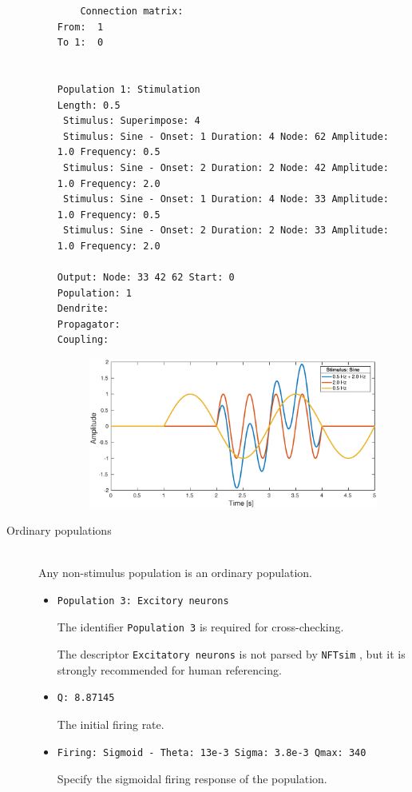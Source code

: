 \documentclass[12pt,a4paper]{article}
\newcommand{\type}[1]{{\small\small\tt #1} }
\newcommand{\NF}[0]{\type{NFTsim}}
\begin{document}
\begin{description}
\begin{itemize}
\begin{lstlisting}
    Connection matrix:
From:  1 
To 1:  0


Population 1: Stimulation
Length: 0.5
 Stimulus: Superimpose: 4
 Stimulus: Sine - Onset: 1 Duration: 4 Node: 62 Amplitude: 1.0 Frequency: 0.5
 Stimulus: Sine - Onset: 2 Duration: 2 Node: 42 Amplitude: 1.0 Frequency: 2.0
 Stimulus: Sine - Onset: 1 Duration: 4 Node: 33 Amplitude: 1.0 Frequency: 0.5
 Stimulus: Sine - Onset: 2 Duration: 2 Node: 33 Amplitude: 1.0 Frequency: 2.0

Output: Node: 33 42 62 Start: 0
Population: 1
Dendrite:  
Propagator:
Coupling: 
    \end{lstlisting}
\begin{figure}[h]
\begin{center}
 \includegraphics[width=\textwidth]{img/stimulus_sine.eps}
\end{center}
\end{figure}

    \end{itemize}
\item[Ordinary populations]\ \\
    Any non-stimulus population is an ordinary population.

    \begin{itemize}
    \item
    \begin{lstlisting}
Population 3: Excitory neurons
    \end{lstlisting}
    The identifier \type{Population 3} is required for cross-checking.

    The descriptor \type{Excitatory neurons} is not parsed by \NF, but it is strongly recommended for human referencing.
    \item
    \begin{lstlisting}
Q: 8.87145
    \end{lstlisting}
    The initial firing rate.
    \item
    \begin{lstlisting}
Firing: Sigmoid - Theta: 13e-3 Sigma: 3.8e-3 Qmax: 340
    \end{lstlisting}
    Specify the sigmoidal firing response of the population.


\end{itemize}
\end{description}
\end{document}
